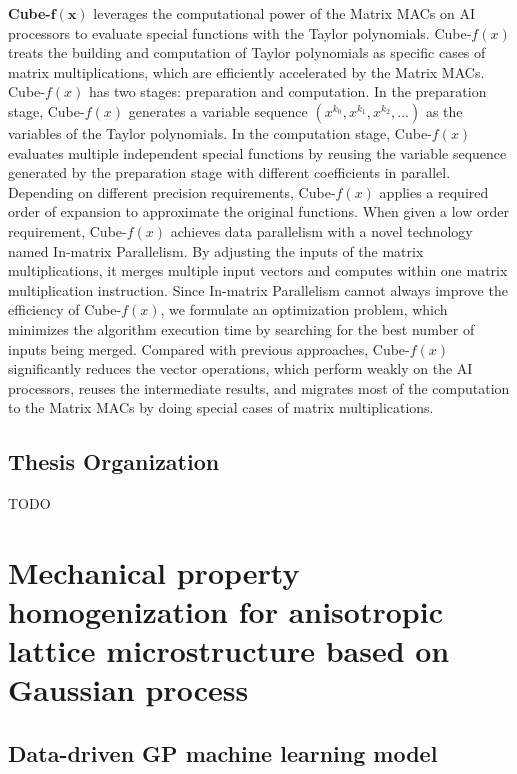 \documentclass[12pt]{extbook}
\begin{document}
\textbf{Cube-}$\mathbf{f(x)}$ leverages the computational power of the Matrix MACs on AI processors to evaluate special functions with the Taylor polynomials. Cube-${f(x)}$ treats the building and computation of Taylor polynomials as specific cases of matrix multiplications, which are efficiently accelerated by the Matrix MACs. Cube-${f(x)}$ has two stages: preparation and computation. In the preparation stage, Cube-${f(x)}$ generates a variable sequence $(x^{k_0}, x^{k_1}, x^{k_2}, ...)$ as the variables of the Taylor polynomials. In the computation stage, Cube-${f(x)}$ evaluates multiple independent special functions by reusing the variable sequence generated by the preparation stage with different coefficients in parallel. Depending on different precision requirements, Cube-${f(x)}$ applies a required order of expansion to approximate the original functions. When given a low order requirement, Cube-${f(x)}$ achieves data parallelism with a novel technology named In-matrix Parallelism. By adjusting the inputs of the matrix multiplications, it merges multiple input vectors and computes within one matrix multiplication instruction. Since In-matrix Parallelism cannot always improve the efficiency of Cube-${f(x)}$, we formulate an optimization problem, which minimizes the algorithm execution time by searching for the best number of inputs being merged. Compared with previous approaches, Cube-${f(x)}$ significantly reduces the vector operations, which perform weakly on the AI processors, reuses the intermediate results, and migrates most of the computation to the Matrix MACs by doing special cases of matrix multiplications.

\section{Thesis Organization}
\label{sec_1_4_organization}

TODO




\chapter{Mechanical property homogenization for anisotropic lattice microstructure based on Gaussian process}
\label{gauss}

\section{Data-driven GP machine learning model}
\label{gauss_gaus}
\end{document}
